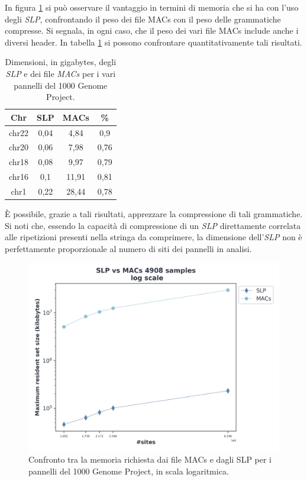 In figura \ref{fig:slpmacschr} si può osservare il vantaggio in termini di
memoria che si ha con l'uso degli \textit{SLP}, confrontando il peso dei file
MACs con il peso delle grammatiche compresse. Si segnala, in ogni caso, che il
peso dei vari file MACs include anche i diversi header. In tabella
\ref{tab:slpmacs} si possono
confrontare quantitativamente tali risultati.
\begin{table}
  \centering
  \caption{Dimensioni, in gigabytes, degli \textit{SLP} e dei file \textit{MACs}
  per i vari pannelli del 1000 Genome Project.}
  \begin{tabular}{c||c|c|c}
    \textbf{Chr} & \textbf{SLP}
    & \textbf{MACs} & \textbf{\%}\\
    \hline
    \hline
    chr22 & 0,04 & 4,84 & 0,9\\
    chr20 & 0,06 & 7,98 & 0,76\\
    chr18 & 0,08 & 9,97 & 0,79\\
    chr16 & 0,1 & 11,91 & 0,81\\
    chr1 & 0,22 & 28,44 & 0,78\\
  \end{tabular}
  \label{tab:slpmacs}
\end{table}
È possibile, grazie a tali risultati, apprezzare la compressione di tali
grammatiche.  
Si noti che, essendo la capacità di compressione di un \textit{SLP}
direttamente correlata alle ripetizioni presenti nella stringa da comprimere, la
dimensione dell'\textit{SLP} non è perfettamente proporzionale al numero di siti
dei pannelli in analisi.
\begin{figure}
  \centering
  \includegraphics[width=0.7\linewidth]{img/slp_vs_macs_log.png}
  \caption{Confronto tra la memoria richiesta dai file MACs e dagli SLP per i
    pannelli del 1000 Genome Project, in scala
    logaritmica.} 
  \label{fig:slpmacschr}
\end{figure}
